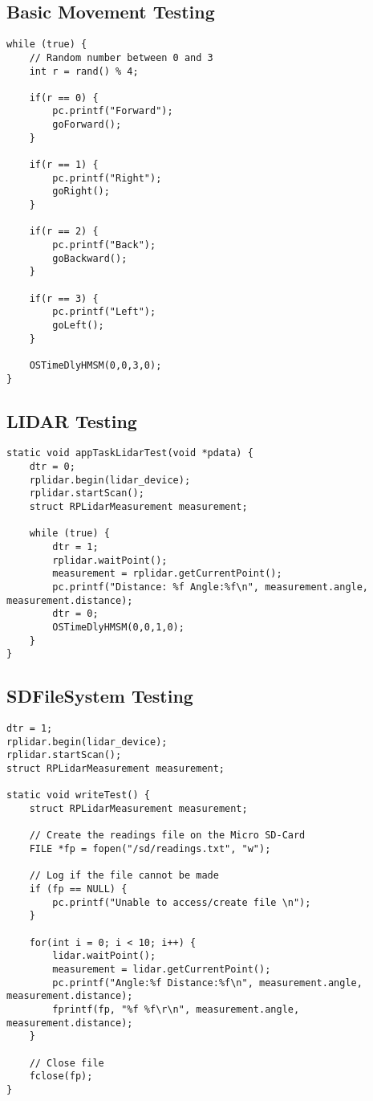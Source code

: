 \begin{appendices}
			\subsection{Basic Movement Testing}
			\label{testcode:movementbasic}
			\begin{lstlisting}
while (true) {
	// Random number between 0 and 3
	int r = rand() % 4;
					
	if(r == 0) {
		pc.printf("Forward");
		goForward();
	}
					
	if(r == 1) {
		pc.printf("Right");
		goRight();
	}
					
	if(r == 2) {
		pc.printf("Back");
		goBackward();
	}
					
	if(r == 3) {
		pc.printf("Left");
		goLeft();
	}

	OSTimeDlyHMSM(0,0,3,0);
}
			\end{lstlisting}
			
			\subsection{LIDAR Testing}
			\label{testcode:observation1}
			\begin{lstlisting}
static void appTaskLidarTest(void *pdata) {
	dtr = 0;
	rplidar.begin(lidar_device);
	rplidar.startScan();
	struct RPLidarMeasurement measurement;
				
	while (true) {
		dtr = 1;
		rplidar.waitPoint();
		measurement = rplidar.getCurrentPoint();
		pc.printf("Distance: %f Angle:%f\n", measurement.angle, measurement.distance);
		dtr = 0;
		OSTimeDlyHMSM(0,0,1,0);
	}
}
			\end{lstlisting}
			
			\subsection{SDFileSystem Testing}
			\label{testcode:filewriting2}
			\begin{lstlisting}
dtr = 1;
rplidar.begin(lidar_device);
rplidar.startScan();
struct RPLidarMeasurement measurement;
				
static void writeTest() {
	struct RPLidarMeasurement measurement;

	// Create the readings file on the Micro SD-Card
	FILE *fp = fopen("/sd/readings.txt", "w");
					
	// Log if the file cannot be made
	if (fp == NULL) {
		pc.printf("Unable to access/create file \n");
	}

	for(int i = 0; i < 10; i++) {
		lidar.waitPoint();
		measurement = lidar.getCurrentPoint();
		pc.printf("Angle:%f Distance:%f\n", measurement.angle, measurement.distance);
		fprintf(fp, "%f %f\r\n", measurement.angle, measurement.distance);
	}
					
	// Close file
	fclose(fp);
}
			\end{lstlisting}
		\end{appendices}
			

